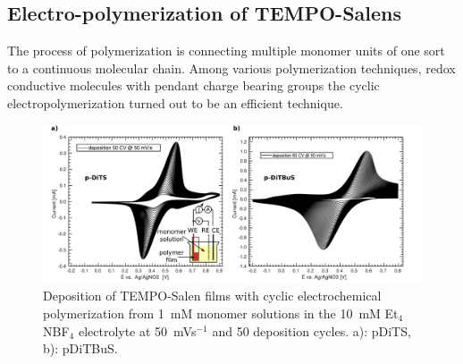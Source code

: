 \subsection{Electro-polymerization of TEMPO-Salens}
The process of polymerization is connecting multiple monomer units of one sort to a continuous molecular chain. Among various polymerization techniques, redox conductive molecules with pendant charge bearing groups the cyclic electropolymerization turned out to be an efficient technique. \\


\begin{figure}[h]
\center
	\includegraphics[width=1\textwidth]{./electrochemistry/figures/DITBUS_DEPO.pdf}
	\caption{Deposition of TEMPO-Salen films with cyclic electrochemical polymerization from 1~mM monomer solutions in the 10~mM Et$_4$NBF$_4$ electrolyte at 50~mVs$^{-1}$ and 50 deposition cycles. a): pDiTS, b): pDiTBuS.}
	\label{fig:DITBUS_DEPO}
\end{figure}


